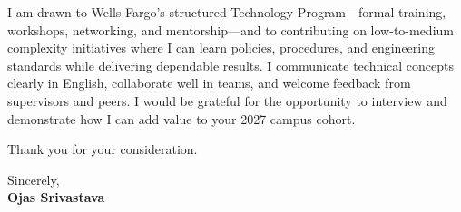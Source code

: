 \documentclass[a4paper,11pt]{article}
\begin{document}
I am drawn to Wells Fargo's structured Technology Program---formal training, workshops, networking, and mentorship---and to contributing on low-to-medium complexity initiatives where I can learn policies, procedures, and engineering standards while delivering dependable results. I communicate technical concepts clearly in English, collaborate well in teams, and welcome feedback from supervisors and peers. I would be grateful for the opportunity to interview and demonstrate how I can add value to your 2027 campus cohort.

Thank you for your consideration.

Sincerely, \\
\vspace{8mm}
\textbf{Ojas Srivastava}
\end{document}
